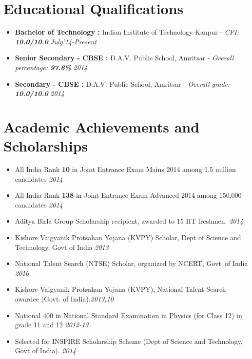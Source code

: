 \documentclass[11pt,a4paper]{moderncv}
\newcommand{\education}[5]{
\item[] \textbf{\large{#1 :}} #2 - \emph{#3: \textbf{#4}} \hfill\textit{#5}
}
\newcommand{\onepage}[1]{
\ifdefined\onep
#1
\fi
}
\newcommand{\twopage}[1]{
\ifdefined\twop
#1
\fi
}
\newcommand{\secspace}{
\onepage{\vspace{-0.27cm}}
\twopage{\vspace{-0.1cm}}
}
\newcommand{\secbelow}{
\onepage{\vspace{-0.07cm}}
}
\begin{document}
\maketitle
\onepage{\vspace{-1.4cm}}
\twopage{\vspace{-1cm}}
\section*{Educational Qualifications}
\secbelow
\begin{itemize}
  \twopage{\setlength\itemsep{0.2cm}}
  \education{Bachelor of Technology}{Indian Institute of Technology Kanpur}{CPI}{10.0/10.0}{July'14-Present}
  \education{Senior Secondary - CBSE}{D.A.V. Public School, Amritsar}{Overall percentage}{97.6\%}{2014}
  \education{Secondary - CBSE}{D.A.V. Public School, Amritsar}{Overall grade}{10.0/10.0}{2014}
\end{itemize}

\secspace
\section*{Academic Achievements and Scholarships}
\secbelow
\begin{itemize}
  \twopage{\setlength\itemsep{0.5em}}
  \item All India Rank \textbf{10} in Joint Entrance Exam Mains 2014 among 1.5 million candidates              \hfill \textit{2014}
  \item All India Rank \textbf{138} in Joint Entrance Exam Advanced 2014 among 150,000 candidates            	\hfill \textit{2014}
  \item Aditya Birla Group Scholarship recipient, awarded to 15 IIT freshmen. \hfill \textit{2014}

  \twopage{
  \item Kishore Vaigyanik Protsahan Yojana (KVPY) Scholar, Dept of Science and Technology, Govt of India
    \hfill \textit{2013}
  \item National Talent Search (NTSE) Scholar, organized by NCERT, Govt\ of India
    \hfill \textit{2010}}

  \onepage{\item Kishore Vaigyanik Protsahan Yojana (KVPY), National
    Talent Search awardee (Govt. of India).\hfill\textit{2013,10}}

  \twopage{
    \item National 400 in National Standard Examination in Physics (for Class 12) in grade 11 and 12 \hfill \textit{2012-13}
    \item Selected for INSPIRE Scholarship Scheme (Dept of Science and Technology, Govt of India). \hfill \textit{2014}}

\end{itemize}
\end{document}
